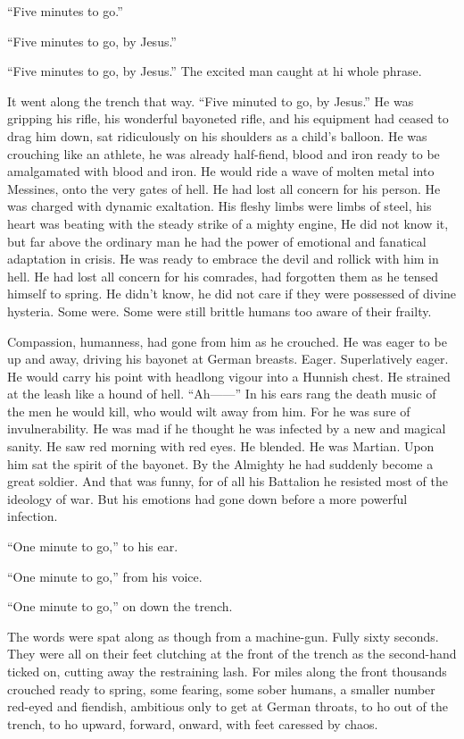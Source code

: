 ``Five minutes to go.''

``Five minutes to go, by Jesus.''

``Five minutes to go, by Jesus.'' The excited man caught at hi whole phrase.

It went along the trench that way. ``Five minuted to go, by Jesus.'' He was gripping his rifle, his wonderful bayoneted rifle, and his equipment had ceased to drag him down, sat ridiculously on his shoulders as a child's balloon. He was crouching like an athlete, he was already half-fiend, blood and iron ready to be amalgamated with blood and iron. He would ride a wave of molten metal into Messines, onto the very gates of hell. He had lost all concern for his person. He was charged with dynamic exaltation. His fleshy limbs were limbs of steel, his heart was beating with the steady strike of a mighty engine, He did not know it, but far above the ordinary man he had the power of emotional and fanatical adaptation in crisis. He was ready to embrace the devil and rollick with him in hell. He had lost all concern for his comrades, had forgotten them as he tensed himself to spring. He didn't know, he did not care if they were possessed of divine hysteria. Some were. Some were still brittle humans too aware of their frailty.

Compassion, humanness, had gone from him as he crouched. He was eager to be up and away, driving his bayonet at German breasts. Eager. Superlatively eager. He would carry his point with headlong vigour into a Hunnish chest. He strained at the leash like a hound of hell. ``Ah------'' In his ears rang the death music of the men he would kill, who would wilt away from him. For he was sure of invulnerability. He was mad if he thought he was infected by a new and magical sanity. He saw red morning with red eyes. He blended. He was Martian. Upon him sat the spirit of the bayonet. By the Almighty he had suddenly become a great soldier. And that was funny, for of all his Battalion he resisted most of the ideology of war. But his emotions had gone down before a more powerful infection.

``One minute to go,'' to his ear.

``One minute to go,'' from his voice.

``One minute to go,'' on down the trench.

The words were spat along as though from a machine-gun. Fully sixty seconds. They were all on their feet clutching at the front of the trench as the second-hand ticked on, cutting away the restraining lash. For miles along the  front thousands crouched ready to spring, some fearing, some sober humans, a smaller number red-eyed and fiendish, ambitious only to get at German throats, to ho out of the trench, to ho upward, forward, onward, with feet caressed by chaos.

